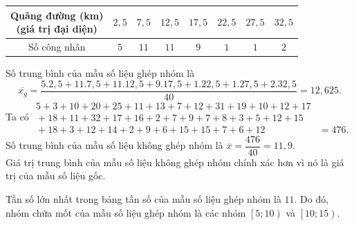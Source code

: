 \begin{ex}
{\begin{listEX}
			\begin{center}
				\begin{tabular}{|*8{c|}}
					 \hline
					 \makecell{Quãng đường (km)\\
					(giá trị đại diện)} & $2{,}5$ & $7{,}5$ & $12{,}5$ & $17{,}5$ & $22{,}5$ & $27{,}5$ &  $32{,}5$\\
					\hline 
					Số công nhân & $5$  & $11$ & $11$ & $9$ & $1$ & $1$ & $2$ \\
					\hline 
				\end{tabular}
			\end{center}
			\item Số trung bình của mẫu  số liệu ghép nhóm là \[\overline{x_g}=\dfrac{5.2{,}5+11.7{,}5+11.12{,}5+9.17{,}5+1.22{,}5+1.27{,}5+2.32{,}5}{40}=12{,}625.\]
			Ta có $\begin{aligned}
			 5+3+10+20+25+11+13+7+12+31+19+10+12+17& \\
			 {}+18+11+32+17+16+2+7+9+7+8+3+5+12+15& \\
			 {}+18+3+12+14+2+9+6+15+15+7+6+12&=476.
		\end{aligned}$\\
		Số trung bình của mẫu  số liệu không ghép nhóm là $\overline{x}=\dfrac{476}{40}=11{,}9$.\\
		Giá trị trung bình của mẫu số liệu không ghép  nhóm chính xác hơn vì nó là giá trị của mẫu số liệu gốc.
		\item Tần số lớn nhất trong bảng tần số của mẫu số liệu ghép nhóm là $11$. Do đó, nhóm chứa mốt của mẫu số liệu ghép nhóm là các  nhóm $\left[5;10 \right)$ và $\left[10;15 \right)$.
	\end{listEX}
} 
\end{ex}

